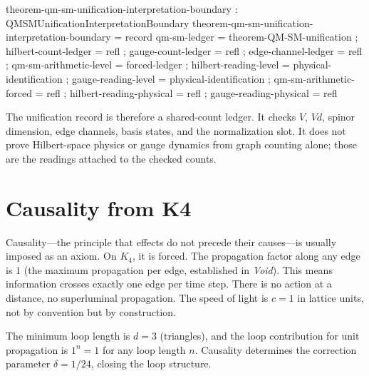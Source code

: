 \documentclass[11pt,a4paper]{book}
\def\texorpdfstring#1#2{#2}%
\begin{document}
\begin{code}
theorem-qm-sm-unification-interpretation-boundary : QMSMUnificationInterpretationBoundary
theorem-qm-sm-unification-interpretation-boundary = record
  { qm-sm-ledger              = theorem-QM-SM-unification
  ; hilbert-count-ledger      = refl
  ; gauge-count-ledger        = refl
  ; edge-channel-ledger       = refl
  ; qm-sm-arithmetic-level    = forced-ledger
  ; hilbert-reading-level     = physical-identification
  ; gauge-reading-level       = physical-identification
  ; qm-sm-arithmetic-forced   = refl
  ; hilbert-reading-physical  = refl
  ; gauge-reading-physical    = refl }
\end{code}

The unification record is therefore a shared-count ledger.  It checks $V$,
$Vd$, spinor dimension, edge channels, basis states, and the normalization
slot.  It does not prove Hilbert-space physics or gauge dynamics from graph
counting alone; those are the readings attached to the checked counts.

\section{Causality from K\texorpdfstring{\textsubscript{4}}{4}}
\label{sec:causality}

Causality---the principle that effects do not precede their causes---is usually imposed as an axiom. On $K_4$, it is forced. The propagation factor along any edge is $1$ (the maximum propagation per edge, established in \textit{Void}). This means information crosses exactly one edge per time step. There is no action at a distance, no superluminal propagation. The speed of light is $c = 1$ in lattice units, not by convention but by construction.

The minimum loop length is $d = 3$ (triangles), and the loop contribution for unit propagation is $1^n = 1$ for any loop length $n$. Causality determines the correction parameter $\delta = 1/24$, closing the loop structure.
\end{document}
